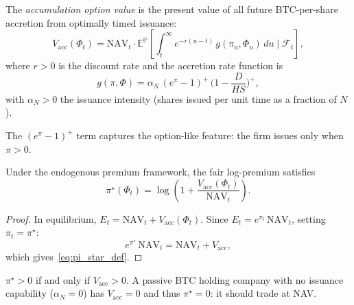 \begin{definition}
  \label{def:vacc}
  The \emph{accumulation option value} is the present value of all future
  BTC-per-share accretion from optimally timed issuance:
  \begin{equation}
    \label{eq:vacc_def}
    V_{\mathrm{acc}}(\Phi_t)
    = \mathrm{NAV}_t \cdot
      \mathbb{E}^{\mathbb{P}}\!\left[
        \int_t^\infty e^{-r(u-t)}\,
        g(\pi_u,\Phi_u)\,du
        \;\Big|\;\mathcal{F}_t
      \right],
  \end{equation}
  where $r > 0$ is the discount rate and the accretion rate function is
  \begin{equation}
    \label{eq:accretion_rate}
    g(\pi,\Phi)
    = \alpha_N\,(e^\pi - 1)^+\,\biggl(1 - \frac{D}{HS}\biggr)^{\!+},
  \end{equation}
  with $\alpha_N > 0$ the issuance intensity (shares issued per unit time
  as a fraction of $N$).
\end{definition}

The $(e^\pi - 1)^+$ term captures the option-like feature: the firm issues
only when $\pi > 0$.

\begin{proposition}
  \label{prop:fair_premium}
  Under the endogenous premium framework, the fair log-premium satisfies
  \begin{equation}
    \label{eq:pi_star_def}
    \boxed{
      \pi^\star(\Phi_t)
      = \log\!\left(1 + \frac{V_{\mathrm{acc}}(\Phi_t)}{\mathrm{NAV}_t}\right).
    }
  \end{equation}
\end{proposition}

\begin{proof}
  In equilibrium, $E_t = \mathrm{NAV}_t + V_{\mathrm{acc}}(\Phi_t)$.
  Since $E_t = e^{\pi_t}\,\mathrm{NAV}_t$, setting $\pi_t = \pi^\star$:
  \[
    e^{\pi^\star}\,\mathrm{NAV}_t = \mathrm{NAV}_t + V_{\mathrm{acc}},
  \]
  which gives~\eqref{eq:pi_star_def}.
\end{proof}

\begin{remark}
  $\pi^\star > 0$ if and only if $V_{\mathrm{acc}} > 0$.  A passive BTC
  holding company with no issuance capability ($\alpha_N = 0$) has
  $V_{\mathrm{acc}} = 0$ and thus $\pi^\star = 0$: it should trade at NAV.
\end{remark}

